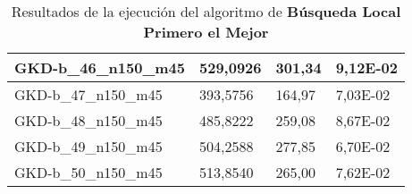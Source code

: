\begin{table}[!ht]
\begin{adjustbox}{height=12cm}
\begin{tabular}{|l|l|l|l|}
        GKD-b\_46\_n150\_m45 & 529,0926 & 301,34 & 9,12E-02 \\ \hline
        GKD-b\_47\_n150\_m45 & 393,5756 & 164,97 & 7,03E-02 \\ \hline
        GKD-b\_48\_n150\_m45 & 485,8222 & 259,08 & 8,67E-02 \\ \hline
        GKD-b\_49\_n150\_m45 & 504,2588 & 277,85 & 6,70E-02 \\ \hline
        GKD-b\_50\_n150\_m45 & 513,8540 & 265,00 & 7,62E-02 \\ \hline
    \end{tabular}
    \end{adjustbox}
    \caption{Resultados de la ejecución del algoritmo de \textbf{Búsqueda Local Primero el Mejor}}
\end{table}

\pagebreak
